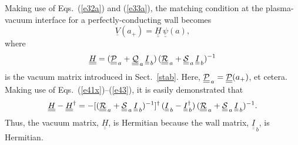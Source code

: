 \documentclass[12pt,prb,aps]{revtex4-1}
\begin{document}
  Making use of Eqs.~(\ref{e32a}) and (\ref{e33a}),  the matching condition at the plasma-vacuum interface  for a perfectly-conducting wall becomes 
 \begin{equation}
 \underline{V}(a_+)= \underline{\underline{H}}\,\underline{\psi}(a),
 \end{equation}
 where 
 \begin{equation}
 \underline{\underline{H}}= (\underline{\underline{\cal P}}_{\,a}+\underline{\underline{\cal Q}}_{\,a}\,\underline{\underline{I}}_{\,b})\,(\underline{\underline{\cal R}}_{\,a}+\underline{\underline{\cal S}}_{\,a}\,\underline{\underline{I}}_{\,b})^{-1}
 \end{equation}
 is  the vacuum matrix introduced in Sect.~\ref{stab}. 
  Here, $\underline{\underline{\cal P}}_{\,a}= \underline{\underline{\cal P}}(a_+)$, et cetera. 
Making use of Eqs.~(\ref{e41x})--(\ref{e43}), it is easily demonstrated that
 \begin{equation}\label{e53}
 \underline{\underline{H}}-\underline{\underline{H}}^\dag =- [(\underline{\underline{\cal R}}_{\,a}+\underline{\underline{\cal S}}_{\,a}\,\underline{\underline{I}}_{\,b})^{-1}]^{\dag}\,(\underline{\underline{I}}_{\,b} -\underline{\underline{I}}^\dag_{\,b})\,  (\underline{\underline{\cal R}}_{\,a}+\underline{\underline{\cal S}}_{\,a}\,\underline{\underline{I}}_{\,b})^{-1}.
\end{equation}
Thus,  the vacuum matrix, $\underline{\underline{H}}$, is Hermitian because  the wall matrix, $\underline{\underline{I}}_{\,b}$, is Hermitian. 
 
\end{document}
